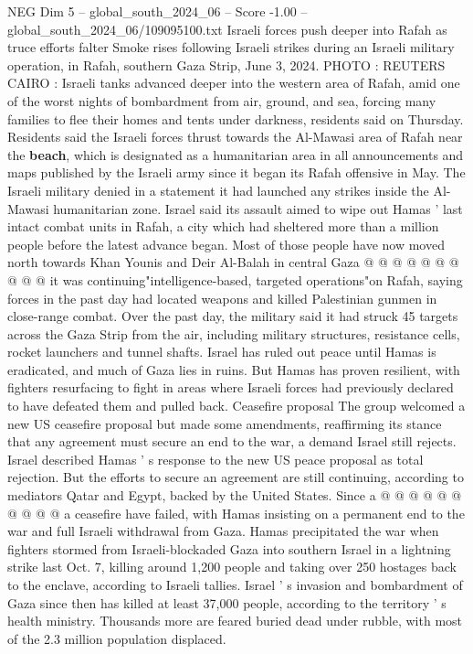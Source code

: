 \begin{textsample}{NEG Dim 5 – global\_south\_2024\_06 – Score -1.00 – global\_south\_2024\_06/109095100.txt}  \label{ex:f5_neg_232}
Israeli forces push deeper into Rafah as truce efforts falter Smoke rises following Israeli strikes during an Israeli military operation, in Rafah, southern Gaza Strip, June 3, 2024.
PHOTO : REUTERS CAIRO : Israeli tanks advanced deeper into the western area of Rafah, amid one of the worst nights of bombardment from air, ground, and sea, forcing many families to flee their homes and tents under darkness, residents said on Thursday.
Residents said the Israeli forces thrust towards the Al-Mawasi area of Rafah near the \textbf{beach}, which is designated as a humanitarian area in all announcements and maps published by the Israeli army since it began its Rafah offensive in May.
The Israeli military denied in a statement it had launched any strikes inside the Al-Mawasi humanitarian zone.
Israel said its assault aimed to wipe out Hamas ' last intact combat units in Rafah, a city which had sheltered more than a million people before the latest advance began.
Most of those people have now moved north towards Khan Younis and Deir Al-Balah in central Gaza @ @ @ @ @ @ @ @ @ @ it was continuing"intelligence-based, targeted operations"on Rafah, saying forces in the past day had located weapons and killed Palestinian gunmen in close-range combat.
Over the past day, the military said it had struck 45 targets across the Gaza Strip from the air, including military structures, resistance cells, rocket launchers and tunnel shafts.
Israel has ruled out peace until Hamas is eradicated, and much of Gaza lies in ruins.
But Hamas has proven resilient, with fighters resurfacing to fight in areas where Israeli forces had previously declared to have defeated them and pulled back.
Ceasefire proposal The group welcomed a new US ceasefire proposal but made some amendments, reaffirming its stance that any agreement must secure an end to the war, a demand Israel still rejects.
Israel described Hamas ' s response to the new US peace proposal as total rejection.
But the efforts to secure an agreement are still continuing, according to mediators Qatar and Egypt, backed by the United States.
Since a @ @ @ @ @ @ @ @ @ @ a ceasefire have failed, with Hamas insisting on a permanent end to the war and full Israeli withdrawal from Gaza.
Hamas precipitated the war when fighters stormed from Israeli-blockaded Gaza into southern Israel in a lightning strike last Oct. 7, killing around 1,200 people and taking over 250 hostages back to the enclave, according to Israeli tallies.
Israel ' s invasion and bombardment of Gaza since then has killed at least 37,000 people, according to the territory ' s health ministry.
Thousands more are feared buried dead under rubble, with most of the 2.3 million population displaced.

\end{textsample}

